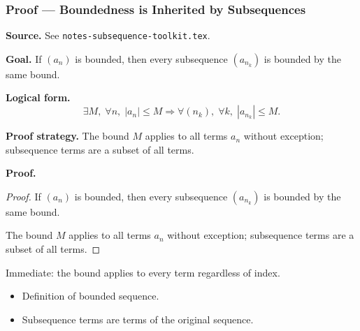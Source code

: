 
\clearpage
{}
\hypertarget{proof-RA-ABB-P-bdd-inherited}{}

\subsubsection[Boundedness is Inherited by Subsequences]{Proof --- Boundedness is Inherited by Subsequences}

\bigskip

\noindent
\textbf{Source.}
See \texttt{notes-subsequence-toolkit.tex}.

\vspace{0.75em}

\noindent
\textbf{Goal.}
If $(a_n)$ is bounded, then every subsequence $(a_{n_k})$ is bounded by the same bound.

\vspace{0.75em}

\noindent
\textbf{Logical form.}
\[
  \exists M,\; \forall n,\; |a_n| \le M \Rightarrow \forall (n_k),\; \forall k,\; |a_{n_k}| \le M.
\]

\vspace{0.75em}

\noindent
\textbf{Proof strategy.}
The bound $M$ applies to all terms $a_n$ without exception; subsequence terms are a subset of all terms.

\vspace{0.75em}

\noindent
\textbf{Proof.}
\begin{proof}
\Claim If $(a_n)$ is bounded, then every subsequence $(a_{n_k})$ is bounded by the same bound.

\Given 

\Goal 

\Strategy The bound $M$ applies to all terms $a_n$ without exception; subsequence terms are a subset of all terms.

\medskip


\end{proof}

\begin{remark*}
Immediate: the bound applies to every term regardless of index.
\end{remark*}

\begin{remark*}[Dependencies]
\begin{itemize}
  \item Definition of bounded sequence.
  \item Subsequence terms are terms of the original sequence.
\end{itemize}
\end{remark*}
